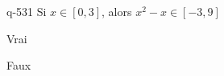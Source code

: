 \begin{truefalse}{q-531}
Si $x\in[0,3]$, alors $x^2-x\in[-3,9]$
\item* Vrai
\item Faux
\end{truefalse}

